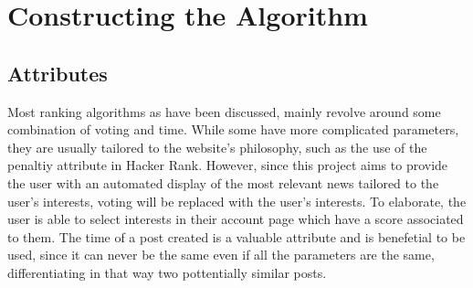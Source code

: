 
\chapter {Constructing the Algorithm}

\section{Attributes}
Most ranking algorithms as have been discussed, mainly revolve around some combination of voting and time. While some have more complicated parameters, they are usually tailored to the website's philosophy, such as the use of  the penaltiy attribute in Hacker Rank. However, since this project aims to provide the user with an automated display of the most relevant news tailored to the user's interests, voting will be replaced with the user's interests. To elaborate, the user is able to select interests in their account page which have a score associated to them. The time of a post created is a valuable attribute and is benefetial to be used, since it can never be the same even if all the parameters are the same, differentiating in that way two pottentially similar posts.
